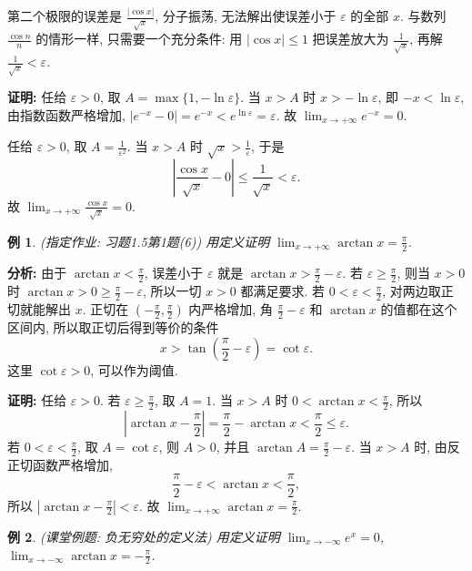\documentclass[UTF8,openany]{ctexbook}
\theoremstyle{chinesetextbook}
\newtheorem{example}{例}[section]
\newenvironment{cnproof}{\par\indent\textbf{证明:} \ignorespaces}{\par}
\begin{document}
第二个极限的误差是 $\displaystyle\frac{|\cos x|}{\sqrt x}$, 分子振荡, 无法解出使误差小于 $\varepsilon$ 的全部 $x$. 与数列 $\displaystyle\frac{\cos n}n$ 的情形一样, 只需要一个充分条件: 用 $|\cos x|\le1$ 把误差放大为 $\displaystyle\frac1{\sqrt x}$, 再解 $\displaystyle\frac1{\sqrt x}<\varepsilon$.
\begin{cnproof}
任给 $\varepsilon>0$, 取 $A=\max\{1,-\ln\varepsilon\}$. 当 $x>A$ 时 $x>-\ln\varepsilon$, 即 $-x<\ln\varepsilon$, 由指数函数严格增加, $|e^{-x}-0|=e^{-x}<e^{\ln\varepsilon}=\varepsilon$. 故 $\displaystyle\lim_{x\to+\infty}e^{-x}=0$.

任给 $\varepsilon>0$, 取 $\displaystyle A=\frac1{\varepsilon^2}$. 当 $x>A$ 时 $\displaystyle\sqrt x>\frac1\varepsilon$, 于是
\[
\left|\frac{\cos x}{\sqrt x}-0\right|\le\frac1{\sqrt x}<\varepsilon.
\]
故 $\displaystyle\lim_{x\to+\infty}\frac{\cos x}{\sqrt x}=0$.
\end{cnproof}
\begin{example}\label{ex:h15-1-6}
\textnormal{(指定作业: 习题1.5第1题(6))} 用定义证明 $\displaystyle\lim_{x\to+\infty}\arctan x=\frac\pi2$.
\end{example}
\par\indent\textbf{分析:} 由于 $\displaystyle\arctan x<\frac\pi2$, 误差小于 $\varepsilon$ 就是 $\displaystyle\arctan x>\frac\pi2-\varepsilon$. 若 $\displaystyle\varepsilon\ge\frac\pi2$, 则当 $x>0$ 时 $\displaystyle\arctan x>0\ge\frac\pi2-\varepsilon$, 所以一切 $x>0$ 都满足要求. 若 $\displaystyle0<\varepsilon<\frac\pi2$, 对两边取正切就能解出 $x$. 正切在 $\displaystyle\left(-\frac\pi2,\frac\pi2\right)$ 内严格增加, 角 $\displaystyle\frac\pi2-\varepsilon$ 和 $\arctan x$ 的值都在这个区间内, 所以取正切后得到等价的条件
\[
x>\tan\left(\frac\pi2-\varepsilon\right)=\cot\varepsilon.
\]
这里 $\cot\varepsilon>0$, 可以作为阈值.
\begin{cnproof}
任给 $\varepsilon>0$. 若 $\displaystyle\varepsilon\ge\frac\pi2$, 取 $A=1$. 当 $x>A$ 时 $\displaystyle0<\arctan x<\frac\pi2$, 所以
\[
\left|\arctan x-\frac\pi2\right|=\frac\pi2-\arctan x<\frac\pi2\le\varepsilon.
\]
若 $\displaystyle0<\varepsilon<\frac\pi2$, 取 $A=\cot\varepsilon$, 则 $A>0$, 并且 $\displaystyle\arctan A=\frac\pi2-\varepsilon$. 当 $x>A$ 时, 由反正切函数严格增加,
\[
\frac\pi2-\varepsilon<\arctan x<\frac\pi2,
\]
所以 $\displaystyle\left|\arctan x-\frac\pi2\right|<\varepsilon$. 故 $\displaystyle\lim_{x\to+\infty}\arctan x=\frac\pi2$.
\end{cnproof}
\begin{example}
\textnormal{(课堂例题: 负无穷处的定义法)} 用定义证明 $\displaystyle\lim_{x\to-\infty}e^x=0$, $\displaystyle\lim_{x\to-\infty}\arctan x=-\frac\pi2$.
\end{example}
\end{document}
